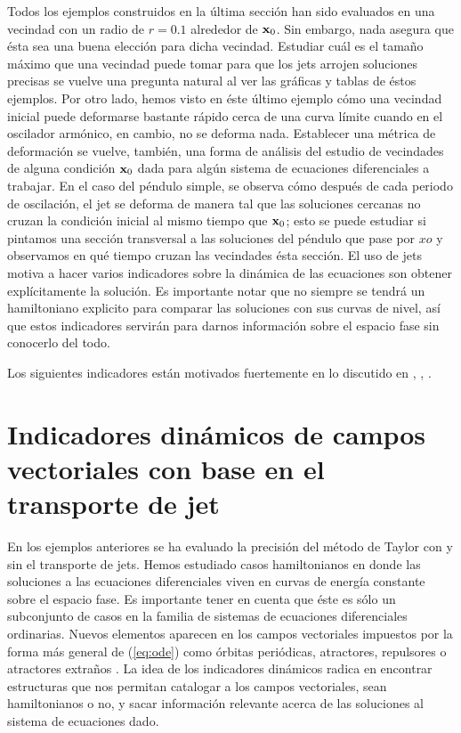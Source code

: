 Todos los ejemplos construidos en la última sección han sido evaluados en una vecindad con un radio de $r = 0.1$ alrededor de $\mathbf{x}_0$. Sin embargo, nada asegura que ésta sea una buena elección para dicha vecindad. Estudiar cuál es el tamaño máximo que una vecindad puede tomar para que los jets arrojen soluciones precisas se vuelve una pregunta natural al ver las gráficas y tablas de éstos ejemplos. Por otro lado, hemos visto en éste último ejemplo cómo una vecindad inicial puede deformarse bastante rápido cerca de una curva límite cuando en el oscilador armónico, en cambio, no se deforma nada. Establecer una métrica de deformación se vuelve, también, una forma de análisis del estudio de vecindades de alguna condición $\mathbf{x}_0$ dada para algún sistema de ecuaciones diferenciales a trabajar. En el caso del péndulo simple, se observa cómo después de cada periodo de oscilación, el jet se deforma de manera tal que las soluciones cercanas no cruzan la condición inicial al mismo tiempo que $\mathbf{x}_0$; esto se puede estudiar si pintamos una sección transversal a las soluciones del péndulo que pase por $xo$ y observamos en qué tiempo cruzan las vecindades ésta sección. El uso de jets motiva a hacer varios indicadores sobre la dinámica de las ecuaciones son obtener explícitamente la solución. Es importante notar que no siempre se tendrá un hamiltoniano explicito para comparar las soluciones con sus curvas de nivel, así que estos indicadores servirán para darnos información sobre el espacio fase sin conocerlo del todo. 

Los siguientes indicadores están motivados fuertemente en lo discutido en \cite{Perez2015}, \cite{Perez2015}, \cite{Haro2009}.

\section{Indicadores dinámicos de campos vectoriales con base en el transporte de jet}
\label{sec:ind-dinam}

En los ejemplos anteriores se ha evaluado la precisión del método de Taylor con y sin el transporte de jets. Hemos estudiado casos hamiltonianos en donde las soluciones a las ecuaciones diferenciales viven en curvas de energía constante sobre el espacio fase. Es importante tener en cuenta que éste es sólo un subconjunto de casos en la familia de sistemas de ecuaciones diferenciales ordinarias. Nuevos elementos aparecen en los campos vectoriales impuestos por la forma más general de (\ref{eq:ode}) como órbitas periódicas, atractores, repulsores o atractores extraños \cite{Perez2015}. La idea de los indicadores dinámicos radica en encontrar estructuras que nos permitan catalogar a los campos vectoriales, sean hamiltonianos o no, y sacar información relevante acerca de las soluciones al sistema de ecuaciones dado. 

